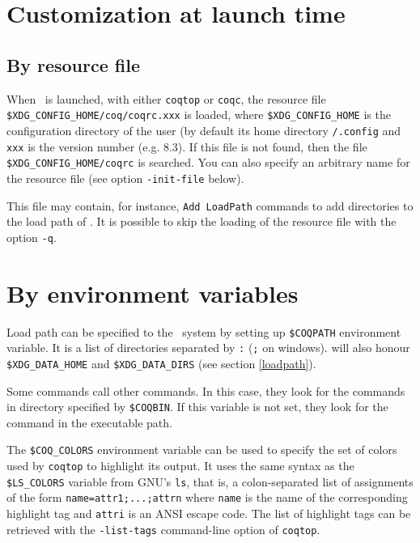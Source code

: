 \section[Customization]{Customization at launch time}

\subsection{By resource file}

When \Coq\ is launched, with either {\tt coqtop} or {\tt coqc}, the
resource file \verb:$XDG_CONFIG_HOME/coq/coqrc.xxx: is loaded, where
\verb:$XDG_CONFIG_HOME: is the configuration directory of the user (by
default its home directory \verb!/.config! and \verb:xxx: is the version
number (e.g. 8.3).  If this file is not found, then the file
\verb:$XDG_CONFIG_HOME/coqrc: is searched. You can also specify an
arbitrary name for the resource file (see option \verb:-init-file:
below).


This file may contain, for instance, \verb:Add LoadPath: commands to add
directories to the load path of \Coq.
It is possible to skip the loading of the resource file with the
option \verb:-q:.

\section{By environment variables\label{EnvVariables}
\label{envars}}

Load path can be specified to the \Coq\ system by setting up
\verb:$COQPATH: environment variable. It is a list of directories
separated by \verb|:| (\verb|;| on windows). {\Coq} will also honour
\verb:$XDG_DATA_HOME: and \verb:$XDG_DATA_DIRS: (see section
\ref{loadpath}).

Some {\Coq} commands call other {\Coq} commands. In this case, they
look for the commands in directory specified by \verb:$COQBIN:. If
this variable is not set, they look for the command in the executable
path.

The \verb:$COQ_COLORS: environment variable can be used to specify the set of
colors used by {\tt coqtop} to highlight its output. It uses the same syntax as
the \verb:$LS_COLORS: variable from GNU's {\tt ls}, that is, a colon-separated
list of assignments of the form \verb:name=attr1;...;attrn: where {\tt name} is
the name of the corresponding highlight tag and {\tt attri} is an ANSI escape
code. The list of highlight tags can be retrieved with the {\tt -list-tags}
command-line option of {\tt coqtop}.

